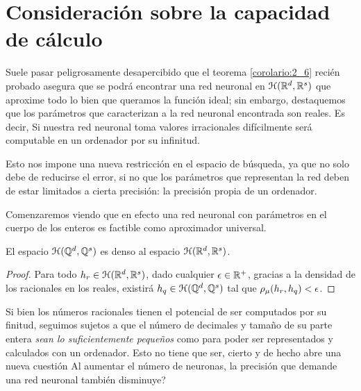 \section{Consideración sobre la capacidad de cálculo}

Suele pasar peligrosamente desapercibido que el teorema  \ref{corolario:2_6} recién probado asegura
que se podrá encontrar una red neuronal en $\mathcal{H}(\mathbb{R}^d,\mathbb{R}^s)$
que aproxime todo lo bien que queramos la función ideal; sin embargo, destaquemos que los parámetros que caracterizan a la red neuronal encontrada son reales. Es decir, 
Si nuestra red neuronal toma valores irracionales difícilmente será computable en un ordenador por su infinitud. 

Esto nos impone una nueva restricción en el espacio de búsqueda, ya que no solo debe de reducirse el error, si no que los parámetros que representan la red deben de estar limitados a cierta precisión: la precisión propia de un ordenador.  

Comenzaremos viendo que en efecto una red neuronal con parámetros en el cuerpo de los enteros es factible como aproximador universal. 

\begin{aportacionOriginal}
    \begin{teorema}
        El espacio $\mathcal{H}(\mathbb{Q}^d, \mathbb{Q}^s)$ es denso al espacio $\mathcal{H}(\mathbb{R}^d,\mathbb{R}^s)$. 
    \end{teorema}
    \begin{proof}
        Para todo $h_r \in \mathcal{H}(\mathbb{R}^d,\mathbb{R}^s)$, dado cualquier $\epsilon \in \mathbb{R}^+$, 
        gracias a la densidad de los racionales en los reales,  existirá $h_q \in \mathcal{H}(\mathbb{Q}^d, \mathbb{Q}^s)$ tal que 
        $\rho_{\mu}( h_r, h_q) < \epsilon$. 
    \end{proof}

    Si bien los números racionales tienen el potencial de ser computados por su finitud, seguimos sujetos a que el número de decimales y tamaño de su parte entera \textit{sean lo suficientemente pequeños} como para poder ser representados y calculados con un ordenador. Esto no tiene que ser, cierto y de hecho abre una nueva cuestión Al aumentar el número de neuronas, la precisión que demande una red neuronal también disminuye?  
\end{aportacionOriginal} 

